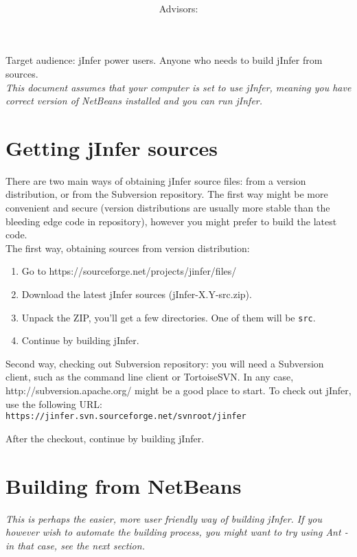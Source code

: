 \documentclass[a4paper,10pt,oneside]{article}
\title{\bf\mftitle}
\author{\mfauthor \\ Advisors: \mfadvisor}
\date{\mfplacedate}
\begin{document}
\maketitle

Target audience: jInfer power users. Anyone who needs to build jInfer from sources.\\

\textit{This document assumes that your computer is set to use jInfer, meaning you have correct version of NetBeans installed and you can run jInfer.}

\section{Getting jInfer sources}
There are two main ways of obtaining jInfer source files: from a version distribution, or from the Subversion repository. The first way might be more convenient and secure (version distributions are usually more stable than the bleeding edge code in repository), however you might prefer to build the latest code.\\

The first way, obtaining sources from version distribution:
\begin{enumerate}
	\item Go to https://sourceforge.net/projects/jinfer/files/
	\item Download the latest jInfer sources (jInfer-X.Y-src.zip).
	\item Unpack the ZIP, you’ll get a few directories. One of them will be \texttt{src}.
	\item Continue by building jInfer.
\end{enumerate}

Second way, checking out Subversion repository: you will need a Subversion client, such as the command line client or TortoiseSVN. In any case, http://subversion.apache.org/ might be a good place to start. To check out jInfer, use the following URL:\\

\texttt{https://jinfer.svn.sourceforge.net/svnroot/jinfer}

After the checkout, continue by building jInfer.

\section{Building from NetBeans}
\textit{This is perhaps the easier, more user friendly way of building jInfer. If you however wish to automate the building process, you might want to try using Ant - in that case, see the next section.}
\end{document}
